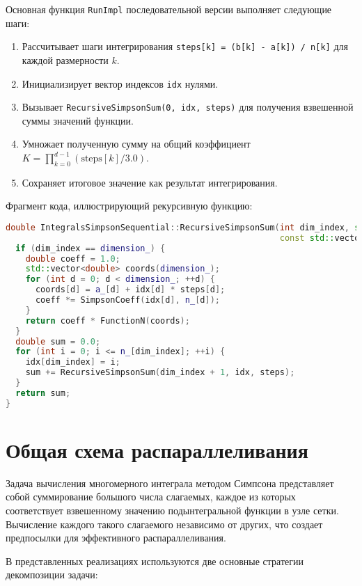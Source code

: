 \documentclass[a4paper,12pt]{article}
\begin{document}
Основная функция \texttt{RunImpl} последовательной версии выполняет следующие шаги:
\begin{enumerate}
    \item Рассчитывает шаги интегрирования \texttt{steps[k] = (b[k] - a[k]) / n[k]} для каждой размерности $k$.
    \item Инициализирует вектор индексов \texttt{idx} нулями.
    \item Вызывает \texttt{RecursiveSimpsonSum(0, idx, steps)} для получения взвешенной суммы значений функции.
    \item Умножает полученную сумму на общий коэффициент $K = \prod_{k=0}^{d-1} (\text{steps}[k] / 3.0)$.
    \item Сохраняет итоговое значение как результат интегрирования.
\end{enumerate}

Фрагмент кода, иллюстрирующий рекурсивную функцию:
\begin{lstlisting}[language=C++, caption=Функция RecursiveSimpsonSum (ops\_seq.cpp), basicstyle=\ttfamily\scriptsize]
double IntegralsSimpsonSequential::RecursiveSimpsonSum(int dim_index, std::vector<int>& idx,
                                                       const std::vector<double>& steps) const {
  if (dim_index == dimension_) {
    double coeff = 1.0;
    std::vector<double> coords(dimension_);
    for (int d = 0; d < dimension_; ++d) {
      coords[d] = a_[d] + idx[d] * steps[d];
      coeff *= SimpsonCoeff(idx[d], n_[d]);
    }
    return coeff * FunctionN(coords);
  }
  double sum = 0.0;
  for (int i = 0; i <= n_[dim_index]; ++i) {
    idx[dim_index] = i;
    sum += RecursiveSimpsonSum(dim_index + 1, idx, steps);
  }
  return sum;
}
\end{lstlisting}

\newpage
\section{Общая схема распараллеливания}
\label{sec:parallel_scheme}

Задача вычисления многомерного интеграла методом Симпсона представляет собой суммирование большого числа слагаемых, каждое из которых соответствует взвешенному значению подынтегральной функции в узле сетки. Вычисление каждого такого слагаемого независимо от других, что создает предпосылки для эффективного распараллеливания.

В представленных реализациях используются две основные стратегии декомпозиции задачи:
\end{document}
